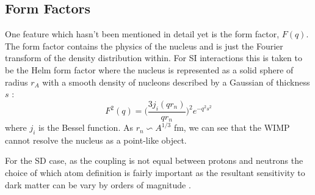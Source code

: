 \subsection{Form Factors}
\par
One feature which hasn't been mentioned in detail yet is the form factor, $F(q)$.
The form factor contains the physics of the nucleus and is just the Fourier transform of the density distribution within.
For SI interactions this is taken to be the Helm form factor where the nucleus is represented as a solid sphere of radius $r_A$ with a smooth density of nucleons described by a Gaussian of thickness $s$ \cite{helm_form_factor_ref}:
\begin{equation}
    F^2(q) = \bigg( \frac{3j_i(qr_n)}{qr_n} \bigg)^2 e^{-q^2 s^2}
\end{equation}
where $j_i$ is the Bessel function.
As $r_n \backsim A^{1/3}$ fm, we can see that the WIMP cannot resolve the nucleus as a point-like object.
\par
For the SD case, as the coupling is not equal between protons and neutrons the choice of which atom definition is fairly important as the resultant sensitivity to dark matter can be vary by orders of magnitude \cite{wimp_nuclear_model_ref,wimp_sd_form_factor_ref}.